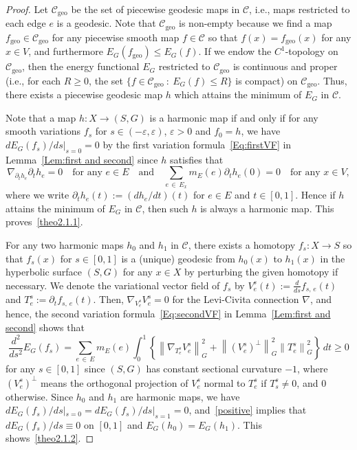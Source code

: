 \documentclass[11pt]{article}
\theoremstyle{definition}
\numberwithin{equation}{section}
\newcommand{\e}{\varepsilon}
\newcommand{\p}{\psi}
\newcommand{\Cc}{\mathcal{C}}
\newcommand*\geo{\mathrm{geo}}
\renewcommand*\p{\partial}
\begin{document}
\begin{proof}
Let $\Cc_\geo$ be the set of piecewise geodesic maps in $\Cc$, i.e., maps restricted to each edge $e$ is a geodesic. Note that $\Cc_\geo$ is non-empty because we find a map $f_\geo \in \Cc_\geo$ for any piecewise smooth map $f\in \Cc$ so that $f(x)=f_\geo(x)$ for any $x\in V$, and furthermore $E_G(f_\geo)\leq E_G(f)$. If we endow the $C^1$-topology on $\Cc_\geo$, then the energy functional $E_G$ restricted to $\Cc_\geo$ is continuous and proper (i.e., for each $R \ge 0$, the set $\{f \in \Cc_\geo \ : \ E_G(f) \le R\}$ is compact) on $\Cc_\geo$. Thus, there exists a piecewise geodesic map $h$ which attains the minimum of $E_G$ in $\Cc$.


Note that a map $h:X \to (S, G)$ is a harmonic map if and only if for any smooth variations $f_s$ for $s\in (-\e, \e)$, $\e>0$ and $f_0=h$, we have $dE_G(f_s)/ds|_{s=0}=0$ by the first variation formula~\eqref{Eq:firstVF} in Lemma~\ref{Lem:first and second} since $h$ satisfies that
\[
\nabla_{\p_t h_{e}}\p_t h_{e}=0 \quad \text{for any }e \in E \quad \text{and} \quad \sum_{e\,\in\,E_x}m_E(e)\p_t h_{e}(0)=0 \quad \text{for any }x \in V,
\]
where we write $\p_t h_{e}(t):=(d h_e/dt)(t)$ for $e \in E$ and $t \in [0, 1]$. Hence if $h$ attains the minimum of $E_G$ in $\Cc$, then such $h$ is always a harmonic map. This proves~\eqref{theo2.1.1}.


For any two harmonic maps $h_0$ and $h_1$ in $\Cc$, there exists a homotopy $f_s: X \to S$ so that $f_s(x)$ for $s \in [0, 1]$ is a (unique) geodesic from $h_0(x)$ to $h_1(x)$ in the hyperbolic surface $(S, G)$ for any $x\in X$ by perturbing the given homotopy if necessary. We denote the variational vector field of $f_s$ by $V_e^s(t):=\tfrac{d}{ds} f_{s,\,e}(t)$ and $T_e^s:=\p_t f_{s,\,e}(t)$. Then, $\nabla_{V_e^s}V_e^s=0$ for the Levi-Civita connection $\nabla$, and hence, the second variation formula~\eqref{Eq:secondVF} in Lemma~\ref{Lem:first and second} shows that
\begin{equation}\label{positive}
\frac{d^2}{ds^2}E_G(f_s)=\sum_{e\,\in\,E} m_E(e)\int_0^1\left\{\left\|\nabla_{T_e^s} V_e^s\right\|_G^2+\left\|\left(V_e^s\right)^\perp\right\|_G^2\left\|T_e^s\right\|_G^2\right\}\,dt\geq 0
\end{equation}
for any $s\in [0,1]$ since $(S,G)$ has constant sectional curvature $-1$, where $(V_e^s)^\perp$ means the orthogonal projection of $V_e^s$ normal to $T_e^s$ if $T_s^s \neq 0$, and $0$ otherwise. Since $h_0$ and $h_1$ are harmonic maps, we have $dE_G(f_s)/ds|_{s=0}=dE_G(f_s)/ds|_{s=1}=0$, and~\eqref{positive} implies that $dE_G(f_s)/ds\equiv 0$ on $[0,1]$ and $E_G(h_0)=E_G(h_1)$. This shows~\eqref{theo2.1.2}.


\end{proof}
\end{document}
